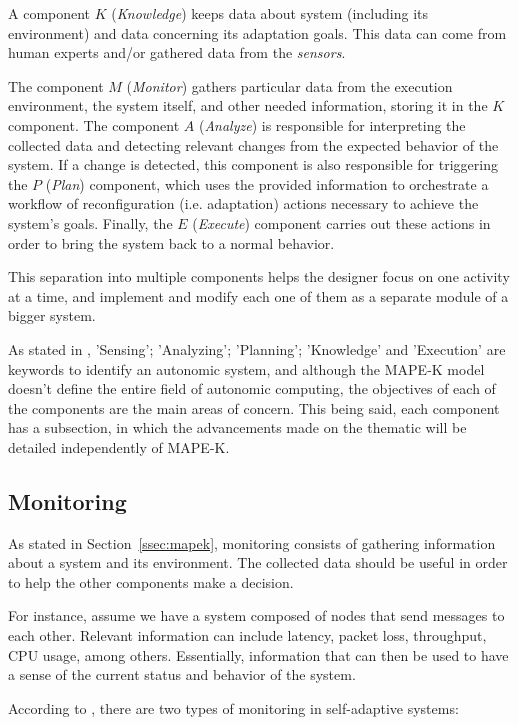 \par A component $K$ (\textit{Knowledge}) keeps data about system (including its environment) and data concerning its adaptation goals. This data can come from human experts and/or gathered data from the \textit{sensors}.
\par The component $M$ (\textit{Monitor}) gathers particular data from the execution environment, the system itself, and other needed information, storing it in the $K$ component. The component $A$ (\textit{Analyze}) is responsible for interpreting the collected data and detecting relevant changes from the expected behavior of the system. If a change is detected, this component is also responsible for triggering the $P$ (\textit{Plan}) component, which uses the provided information to orchestrate a workflow of reconfiguration (i.e. adaptation) actions necessary to achieve the system's goals. Finally, the $E$ (\textit{Execute}) component carries out these actions in order to bring the system back to a normal behavior.
\par This separation into multiple components helps the designer focus on one activity at a time, and implement and modify each one of them as a separate module of a bigger system.
\par As stated in \cite{Parashar2005}, 'Sensing'; 'Analyzing'; 'Planning'; 'Knowledge' and 'Execution' are keywords to identify an autonomic system, and although the MAPE-K model doesn't define the entire field of autonomic computing, the objectives of each of the components are the main areas of concern. This being said, each component has a subsection, in which the advancements made on the thematic will be detailed independently of MAPE-K.
%
%
%
\subsection{Monitoring}
\label{ssec:monitoring}
\par As stated in Section~\ref{ssec:mapek}, monitoring consists of gathering information about a system and its environment. The collected data should be useful in order to help the other components make a decision.
\par For instance, assume we have a system composed of nodes that send messages to each other. Relevant information can include latency, packet loss, throughput, CPU usage, among others. Essentially, information that can then be used to have a sense of the current status and behavior of the system. 
\par According to \cite{Huebscher2008}, there are two types of monitoring in self-adaptive systems:
